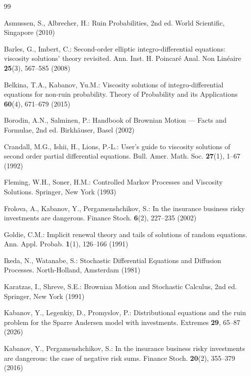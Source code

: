 \documentclass[smallextended]{svjour3}
\begin{document}
\begin{thebibliography}{99}

Asmussen, S., Albrecher, H.: 
Ruin Probabilities, 2nd ed. 
World Scientific, Singapore (2010)

Barles, G., Imbert, C.: 
Second-order elliptic integro-differential equations: viscosity solutions' theory revisited. 
Ann. Inst. H. Poincar\'{e} Anal. Non Lin\'{e}aire \textbf{25}(3), 567--585 (2008)

Belkina, T.A., Kabanov, Yu.M.: 
Viscosity solutions of integro-differential equations for non-ruin probability. 
Theory of Probability and its Applications \textbf{60}(4), 671--679 (2015)

Borodin, A.N., Salminen, P.: 
Handbook of Brownian Motion --- Facts and Formulae, 2nd ed. 
Birkh\"{a}user, Basel (2002)

Crandall, M.G., Ishii, H., Lions, P.-L.: 
User's guide to viscosity solutions of second order partial differential equations. 
Bull. Amer. Math. Soc. \textbf{27}(1), 1--67 (1992)

Fleming, W.H., Soner, H.M.: 
Controlled Markov Processes and Viscosity Solutions. 
Springer, New York (1993)

Frolova, A., Kabanov, Y., Pergamenshchikov, S.: 
In the insurance business risky investments are dangerous. 
Finance Stoch. \textbf{6}(2), 227--235 (2002)

Goldie, C.M.: 
Implicit renewal theory and tails of solutions of random equations. 
Ann. Appl. Probab. \textbf{1}(1), 126--166 (1991)

Ikeda, N., Watanabe, S.: 
Stochastic Differential Equations and Diffusion Processes. 
North-Holland, Amsterdam (1981)

Karatzas, I., Shreve, S.E.: 
Brownian Motion and Stochastic Calculus, 2nd ed. 
Springer, New York (1991)

Kabanov, Y., Legenkiy, D., Promyslov, P.: 
Distributional equations and the ruin problem for the Sparre Andersen model with investments. 
Extremes \textbf{29}, 65--87 (2026)

Kabanov, Y., Pergamenshchikov, S.: 
In the insurance business risky investments are dangerous: the case of negative risk sums. 
Finance Stoch. \textbf{20}(2), 355--379 (2016)


\end{thebibliography}
\end{document}
